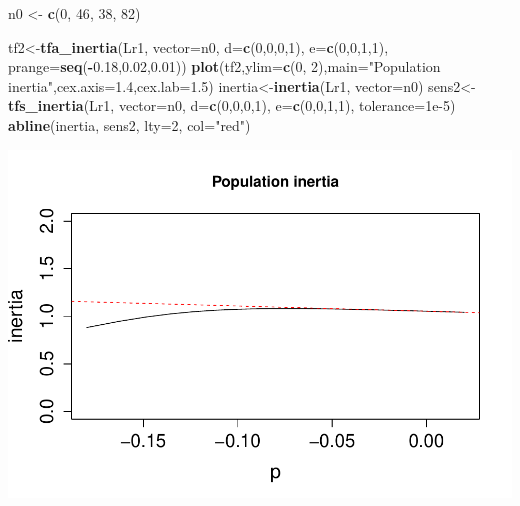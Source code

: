 \documentclass[
]{book}
\newenvironment{Shaded}{\begin{snugshade}}{\end{snugshade}}
\newcommand{\AttributeTok}[1]{\textcolor[rgb]{0.13,0.29,0.53}{#1}}
\newcommand{\DecValTok}[1]{\textcolor[rgb]{0.00,0.00,0.81}{#1}}
\newcommand{\FloatTok}[1]{\textcolor[rgb]{0.00,0.00,0.81}{#1}}
\newcommand{\FunctionTok}[1]{\textcolor[rgb]{0.13,0.29,0.53}{\textbf{#1}}}
\newcommand{\NormalTok}[1]{#1}
\newcommand{\OtherTok}[1]{\textcolor[rgb]{0.56,0.35,0.01}{#1}}
\newcommand{\SpecialCharTok}[1]{\textcolor[rgb]{0.81,0.36,0.00}{\textbf{#1}}}
\newcommand{\StringTok}[1]{\textcolor[rgb]{0.31,0.60,0.02}{#1}}
\theoremstyle{definition}
\theoremstyle{definition}
\theoremstyle{definition}
\theoremstyle{definition}
\theoremstyle{remark}
\begin{document}
\begin{Shaded}
\begin{Highlighting}[]
\NormalTok{n0 }\OtherTok{\textless{}{-}} \FunctionTok{c}\NormalTok{(}\DecValTok{0}\NormalTok{, }\DecValTok{46}\NormalTok{, }\DecValTok{38}\NormalTok{, }\DecValTok{82}\NormalTok{)}

\NormalTok{tf2}\OtherTok{\textless{}{-}}\FunctionTok{tfa\_inertia}\NormalTok{(Lr1, }\AttributeTok{vector=}\NormalTok{n0, }\AttributeTok{d=}\FunctionTok{c}\NormalTok{(}\DecValTok{0}\NormalTok{,}\DecValTok{0}\NormalTok{,}\DecValTok{0}\NormalTok{,}\DecValTok{1}\NormalTok{), }\AttributeTok{e=}\FunctionTok{c}\NormalTok{(}\DecValTok{0}\NormalTok{,}\DecValTok{0}\NormalTok{,}\DecValTok{1}\NormalTok{,}\DecValTok{1}\NormalTok{), }\AttributeTok{prange=}\FunctionTok{seq}\NormalTok{(}\SpecialCharTok{{-}}\FloatTok{0.18}\NormalTok{,}\FloatTok{0.02}\NormalTok{,}\FloatTok{0.01}\NormalTok{))}
\FunctionTok{plot}\NormalTok{(tf2,}\AttributeTok{ylim=}\FunctionTok{c}\NormalTok{(}\DecValTok{0}\NormalTok{, }\DecValTok{2}\NormalTok{),}\AttributeTok{main=}\StringTok{"Population inertia"}\NormalTok{,}\AttributeTok{cex.axis=}\FloatTok{1.4}\NormalTok{,}\AttributeTok{cex.lab=}\FloatTok{1.5}\NormalTok{)}
\NormalTok{inertia}\OtherTok{\textless{}{-}}\FunctionTok{inertia}\NormalTok{(Lr1, }\AttributeTok{vector=}\NormalTok{n0)}
\NormalTok{sens2}\OtherTok{\textless{}{-}}\FunctionTok{tfs\_inertia}\NormalTok{(Lr1, }\AttributeTok{vector=}\NormalTok{n0, }\AttributeTok{d=}\FunctionTok{c}\NormalTok{(}\DecValTok{0}\NormalTok{,}\DecValTok{0}\NormalTok{,}\DecValTok{0}\NormalTok{,}\DecValTok{1}\NormalTok{), }\AttributeTok{e=}\FunctionTok{c}\NormalTok{(}\DecValTok{0}\NormalTok{,}\DecValTok{0}\NormalTok{,}\DecValTok{1}\NormalTok{,}\DecValTok{1}\NormalTok{), }\AttributeTok{tolerance=}\FloatTok{1e{-}5}\NormalTok{)}
\FunctionTok{abline}\NormalTok{(inertia, sens2, }\AttributeTok{lty=}\DecValTok{2}\NormalTok{, }\AttributeTok{col=}\StringTok{"red"}\NormalTok{)}
\end{Highlighting}
\end{Shaded}

\includegraphics{Diagnostico_Poblacional_files/figure-latex/unnamed-chunk-21-1.pdf}
\end{document}
